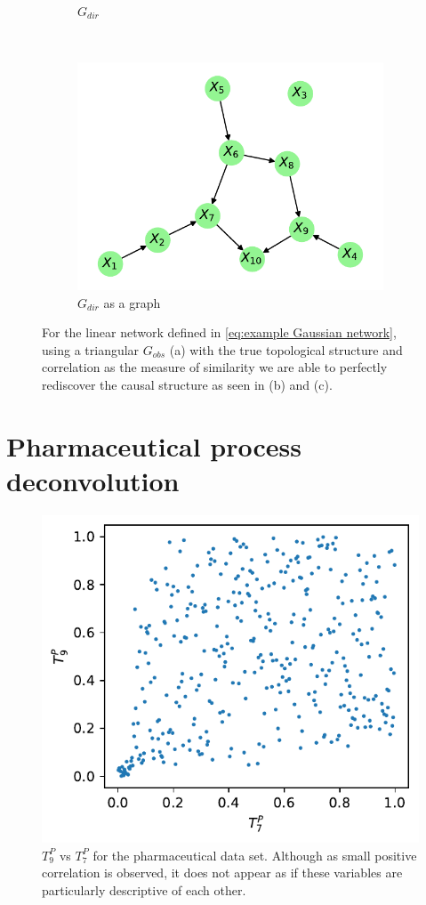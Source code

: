\documentclass[../Thesis.tex]{subfiles}
\begin{document}
\begin{figure}[H]
\begin{subfigure}[t]{0.49\textwidth}
        \caption{$G_{dir}$}
    \end{subfigure}
    \\[\baselineskip]
    \begin{subfigure}[t]{0.49\textwidth}
        \centering
        \includegraphics[width=.9\linewidth]{figures/Gaussian Network Theoretical/Graph from triangular G obs - cor.pdf}
        \caption{$G_{dir}$ as a graph}
    \end{subfigure}
    \caption{For the linear network defined in \autoref{eq:example Gaussian network}, using a triangular $G_{obs}$ (a) with the true topological structure and correlation as the measure of similarity we are able to perfectly rediscover the causal structure as seen in (b) and (c).}
    \label{fig:Gaussian network triangular G_obs using correlation}
\end{figure}

\newpage
\section{Pharmaceutical process deconvolution}
\begin{figure}[H]
    \centering
    \includegraphics[width=.5\linewidth]{figures/Cycle data/G_dir times - symmetric - TP9 vs TP7.pdf}
    \caption{$T^P_9$ vs $T^P_7$ for the pharmaceutical data set. Although as small positive correlation is observed, it does not appear as if these variables are particularly descriptive of each other.}
    \label{fig:G_dir times - TP9 vs TP7}
\end{figure}
\end{document}
